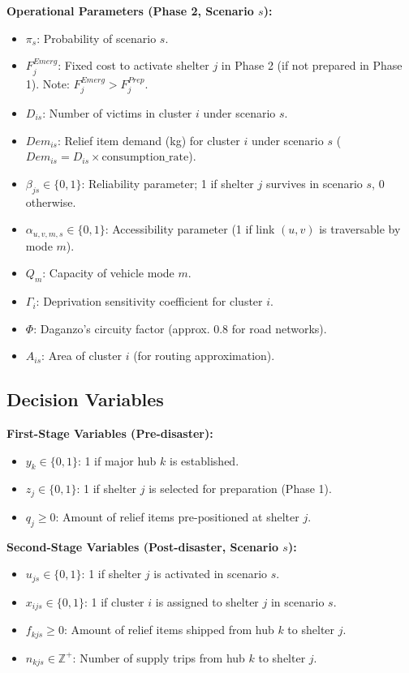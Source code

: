 \noindent \textbf{Operational Parameters (Phase 2, Scenario $s$):}
\begin{itemize}
    \item $\pi_s$: Probability of scenario $s$.
    \item $F_j^{Emerg}$: Fixed cost to activate shelter $j$ in Phase 2 (if not prepared in Phase 1). Note: $F_j^{Emerg} > F_j^{Prep}$.
    \item $D_{is}$: Number of victims in cluster $i$ under scenario $s$.
    \item $Dem_{is}$: Relief item demand (kg) for cluster $i$ under scenario $s$ ($Dem_{is} = D_{is} \times \text{consumption\_rate}$).
    \item $\beta_{js} \in \{0,1\}$: Reliability parameter; 1 if shelter $j$ survives in scenario $s$, 0 otherwise.
    \item $\alpha_{u,v,m,s} \in \{0,1\}$: Accessibility parameter (1 if link $(u,v)$ is traversable by mode $m$).
    \item $Q_{m}$: Capacity of vehicle mode $m$.
    \item $\Gamma_i$: Deprivation sensitivity coefficient for cluster $i$.
    \item $\Phi$: Daganzo's circuity factor (approx. 0.8 for road networks).
    \item $A_{is}$: Area of cluster $i$ (for routing approximation).
\end{itemize}

\subsection*{Decision Variables}
\noindent \textbf{First-Stage Variables (Pre-disaster):}
\begin{itemize}
    \item $y_k \in \{0,1\}$: 1 if major hub $k$ is established.
    \item $z_j \in \{0,1\}$: 1 if shelter $j$ is selected for preparation (Phase 1).
    \item $q_j \ge 0$: Amount of relief items pre-positioned at shelter $j$.
\end{itemize}

\noindent \textbf{Second-Stage Variables (Post-disaster, Scenario $s$):}
\begin{itemize}
    \item $u_{js} \in \{0,1\}$: 1 if shelter $j$ is activated in scenario $s$.
    \item $x_{ijs} \in \{0,1\}$: 1 if cluster $i$ is assigned to shelter $j$ in scenario $s$.
    \item $f_{kjs} \ge 0$: Amount of relief items shipped from hub $k$ to shelter $j$.
    \item $n_{kjs} \in \mathbb{Z}^+$: Number of supply trips from hub $k$ to shelter $j$.
\end{itemize}

